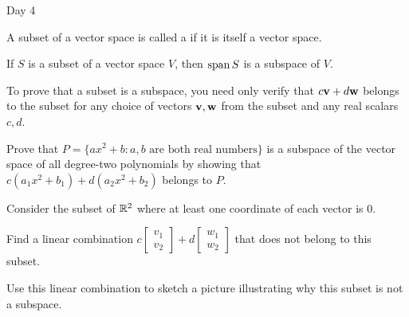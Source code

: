 \begin{applicationActivities}{Day 4}
\begin{definition}
  A subset of a vector space is called a  if it is
  itself a vector space.
\end{definition}

\begin{fact}
  If \(S\) is a subset of a vector space \(V\), then
  \(\operatorname{span} S\) is a subspace of \(V\).
\end{fact}

\begin{remark}
  To prove that a subset is a subspace, you need only verify that
  \(c\mathbf v+d\mathbf w\) belongs to the subset for any choice of
  vectors \(\mathbf v,\mathbf w\) from the subset and any real scalars \(c,d\).
\end{remark}

\begin{activity}{5}
  Prove that \(P=\{ax^2+b:a,b\text{ are both real numbers}\}\) is a subspace
  of the vector space of all degree-two polynomials by showing that
  \(c(a_1x^2+b_1)+d(a_2x^2+b_2)\) belongs to \(P\).
\end{activity}

\begin{activity}{10}
  Consider the subset of \(\mathbb{R}^2\) where at least one coordinate of
  each vector is \(0\).
  \begin{center}
  \end{center}
  \begin{subactivity}
    Find a linear combination
    \(c\begin{bmatrix}v_1\\v_2\end{bmatrix}+
    d\begin{bmatrix}w_1\\w_2\end{bmatrix}\) that does not
    belong to this subset.
  \end{subactivity}
  \begin{subactivity}
    Use this linear combination to sketch a picture
    illustrating why this subset is not
    a subspace.
  \end{subactivity}
\end{activity}


\end{applicationActivities}
